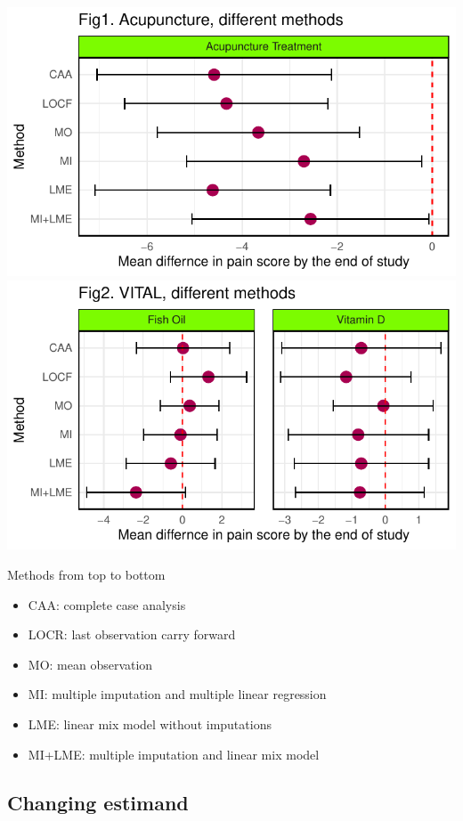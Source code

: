 \documentclass{article}
\newcommand{\pandocbounded}[1]{#1}
\begin{document}
\pandocbounded{\includegraphics[keepaspectratio]{Final_Report_files/figure-latex/unnamed-chunk-36-1.pdf}}
\pandocbounded{\includegraphics[keepaspectratio]{Final_Report_files/figure-latex/unnamed-chunk-36-2.pdf}}

Methods from top to bottom

\begin{itemize}
\item
  CAA: complete case analysis
\item
  LOCR: last observation carry forward
\item
  MO: mean observation
\item
  MI: multiple imputation and multiple linear regression
\item
  LME: linear mix model without imputations
\item
  MI+LME: multiple imputation and linear mix model
\end{itemize}

\subsection{Changing estimand}\label{changing-estimand}
\end{document}

